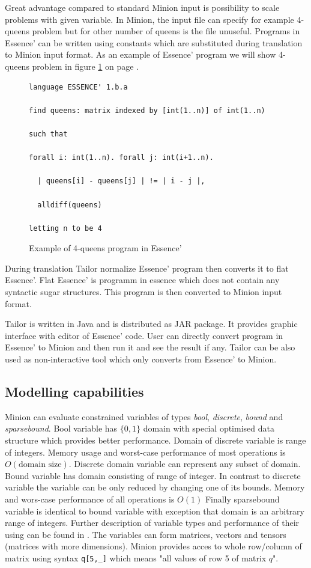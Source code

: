 Great advantage compared to standard Minion input is possibility to scale problems
with given variable. In Minion, the input file can specify for example 4-queens problem 
but for other number of queens is the file unuseful. Programs in Essence' can be written
using constants which are substituted during translation to Minion input format.
As an example of Essence' program we will show 4-queens problem in figure \ref{essence-source-4queens} 
on page \pageref{essence-source-4queens}.  

\begin{figure}
\caption{\label{essence-source-4queens}Example of 4-queens program in Essence'}
\begin{verbatim}
language ESSENCE' 1.b.a

find queens: matrix indexed by [int(1..n)] of int(1..n)

such that

forall i: int(1..n). forall j: int(i+1..n).

  | queens[i] - queens[j] | != | i - j |,

  alldiff(queens)
  
letting n to be 4
\end{verbatim}
\end{figure}

During translation Tailor normalize Essence' program then converts it to flat Essence'.
Flat Essence' is programm in essence which does not contain any syntactic sugar structures.
This program is then converted to Minion input format.

Tailor is written in Java and is distributed as JAR package. It provides graphic interface
with editor of Essence' code. User can directly convert program in Essence' to Minion
and then run it and see the result if any. Tailor can be also used as non-interactive 
tool which only converts from Essence' to Minion.

\subsection{Modelling capabilities}

Minion can evaluate constrained variables of types {\em bool}, {\em discrete}, {\em bound} 
and {\em sparsebound}. Bool variable has $\{0,1\}$ domain with special 
optimised data structure which provides better performance. Domain of discrete variable is 
range of integers. Memory usage and worst-case performance of most operations
is $O(\text{domain size})$. Discrete domain variable can represent any
subset of domain. Bound variable has domain consisting of range of integer.
In contrast to discrete variable the variable can be only reduced by 
changing one of its bounds. Memory and wors-case performance of all 
operations is $O(1)$   Finally sparsebound variable is identical to 
bound variable with exception that domain is an arbitrary range of 
integers. Further description of variable types and performance of 
their using can be found in \cite{minion-manual}. The variables can
form matrices, vectors and tensors (matrices with more dimensions).
Minion provides acces to whole row/column of matrix using syntax 
\verb=q[5,_]= which means "all values of row 5 of matrix $q$".

